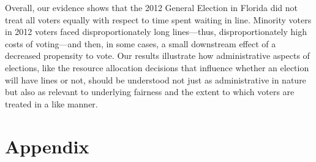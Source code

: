 \documentclass[12pt,titlepage]{article}
\begin{document}
Overall, our evidence shows that the 2012 General Election in Florida
did not treat all voters equally with respect to time spent waiting in
line.  Minority voters in 2012 voters faced disproportionately long
lines---thus, disproportionately high costs of voting---and then, in
some cases, a small downstream effect of a decreased propensity to
vote.  Our results illustrate how administrative aspects of elections,
like the resource allocation decisions that influence whether an
election will have lines or not, should be understood not just as
administrative in nature but also as relevant to underlying fairness
and the extent to which voters are treated in a like manner.




% 

\clearpage
\newpage




\newpage
\appendix
\section*{Appendix}


\end{document}
